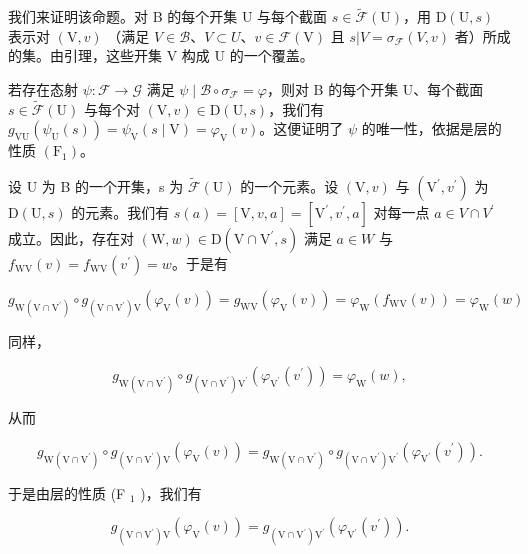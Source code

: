 我们来证明该命题。对 B 的每个开集 U 与每个截面 \(s \in \widetilde{\mathcal{F}}(\mathrm{U})\)，用 \(\mathrm{D}(\mathrm{U}, s)\) 表示对 \((\mathrm{V}, v)\) （满足 \(V \in \mathcal{B}\)、\(V \subset U\)、\(v \in \mathcal{F}(\mathrm{V})\) 且 \(s | V = \sigma_{\mathcal{F}}(V, v)\) 者）所成的集。由引理，这些开集 V 构成 U 的一个覆盖。

若存在态射 \(\psi\colon\mathcal{F}\to\mathcal{G}\) 满足 \(\psi\mid\mathcal{B}\circ\sigma_{\mathcal{F}}=\varphi\)，则对 B 的每个开集 U、每个截面 \(s\in\widetilde{\mathcal{F}}(\mathrm{U})\) 与每个对 \((\mathrm{V},v)\in\mathrm{D}(\mathrm{U},s)\)，我们有 \(g_{\mathrm{VU}}(\psi_{\mathrm{U}}(s))=\psi_{\mathrm{V}}(s\mid\mathrm{V})=\varphi_{\mathrm{V}}(v)\)。这便证明了 \(\psi\) 的唯一性，依据是层的性质 \((\mathrm{F}_{1})\)。

设 U 为 B 的一个开集，s 为 \(\widetilde{\mathcal{F}}(\mathrm{U})\) 的一个元素。设 \((\mathrm{V},v)\) 与 \((\mathrm{V}^{\prime},v^{\prime})\) 为 \(\mathrm{D}(\mathrm{U},s)\) 的元素。我们有 \(s(a)=[\mathrm{V},v,a]=[\mathrm{V}^{\prime},v^{\prime},a]\) 对每一点 \(a\in V\cap V^{\prime}\) 成立。因此，存在对 \((\mathrm{W},w)\in\mathrm{D}(\mathrm{V}\cap\mathrm{V}^{\prime},s)\) 满足 \(a\in W\) 与 \(f_{\mathrm{WV}}(v)=f_{\mathrm{WV}}(v^{\prime})=w\)。于是有

\[
g _ {\mathrm{W} (\mathrm{V} \cap \mathrm{V} ^ {\prime})} \circ g _ {(\mathrm{V} \cap \mathrm{V} ^ {\prime}) \mathrm{V}} (\varphi_ {\mathrm{V}} (v)) = g _ {\mathrm{WV}} (\varphi_ {\mathrm{V}} (v)) = \varphi_ {\mathrm{W}} (f _ {\mathrm{WV}} (v)) = \varphi_ {\mathrm{W}} (w)
\]

同样，

\[
g _ {\mathrm{W} (\mathrm{V} \cap \mathrm{V} ^ {\prime})} \circ g _ {(\mathrm{V} \cap \mathrm{V} ^ {\prime}) \mathrm{V} ^ {\prime}} (\varphi_ {\mathrm{V} ^ {\prime}} (v ^ {\prime})) = \varphi_ {\mathrm{W}} (w),
\]

从而

\[
g _ {\mathrm{W} (\mathrm{V} \cap \mathrm{V} ^ {\prime})} \circ g _ {(\mathrm{V} \cap \mathrm{V} ^ {\prime}) \mathrm{V}} (\varphi_ {\mathrm{V}} (v)) = g _ {\mathrm{W} (\mathrm{V} \cap \mathrm{V} ^ {\prime})} \circ g _ {(\mathrm{V} \cap \mathrm{V} ^ {\prime}) \mathrm{V} ^ {\prime}} (\varphi_ {\mathrm{V} ^ {\prime}} (v ^ {\prime})).
\]

于是由层的性质 (F \(_{1}\) )，我们有

\[
g _ {(\mathrm{V} \cap \mathrm{V} ^ {\prime}) \mathrm{V}} (\varphi_ {\mathrm{V}} (v)) = g _ {(\mathrm{V} \cap \mathrm{V} ^ {\prime}) \mathrm{V} ^ {\prime}} (\varphi_ {\mathrm{V} ^ {\prime}} (v ^ {\prime})).
\]

